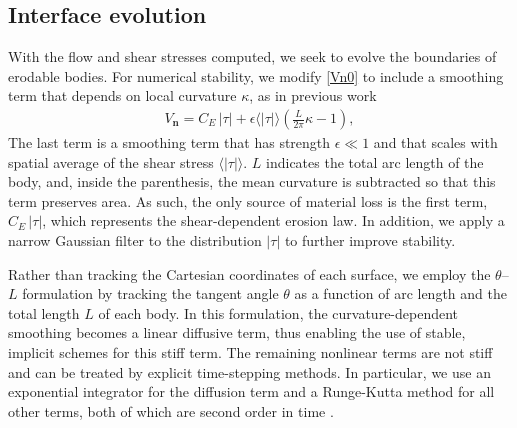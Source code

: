\documentclass[3p]{elsarticle}
\newcommand{\nn}{{\mathbf{n}}}
\newcommand{\abs}[1]{\left| #1 \right|}
\newcommand{\Vn}{V_\nn}
\newcommand{\CE}{C_E}
\newcommand{\thL}{$\theta$--$L$}
\begin{document}
\subsection{Interface evolution}

With the flow and shear stresses computed, we seek to evolve the boundaries of erodable bodies. For numerical stability, we modify \eqref{Vn0} to include a smoothing term that depends on local curvature $\kappa$, as in previous work \citep{quaife2018boundary}
\begin{align}
  \Vn = \CE \, \abs{\tau} + \epsilon \langle\abs{\tau}\rangle \left(
    \frac{L}{2\pi} \kappa - 1 \right),
\end{align}
The last term is a smoothing term that has strength $\epsilon \ll 1$ and that scales with spatial average of the shear stress $\langle\abs{\tau}\rangle$. $L$ indicates the total arc length of the body, and, inside the parenthesis,  the mean curvature is subtracted so that this term preserves area. As such, the only source of material loss is the first term, $\CE \, \abs{\tau}$, which represents the shear-dependent erosion law. In addition, we apply a narrow Gaussian filter to the distribution $\abs{\tau}$ to further improve stability.

Rather than tracking the Cartesian coordinates of each surface, we employ the {\thL} formulation \cite{hou-low-she1994, Moore2013, MooreCPAM2017, mac2022morphological} by tracking the tangent angle $\theta$ as a function of arc length and the total length $L$ of each body.  In this formulation, the curvature-dependent smoothing becomes a linear diffusive term, thus enabling the use of stable, implicit schemes for this stiff term. The remaining nonlinear terms are not stiff and can be treated by explicit time-stepping methods. In particular, we use an exponential integrator for the diffusion term and a Runge-Kutta method for all other terms, both of which are second order in time \cite{quaife2018boundary}.


\end{document}
